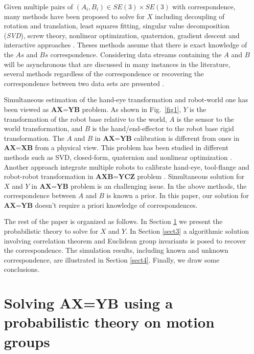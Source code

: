 \documentclass[conference,letterpaper]{IEEEtran}
\begin{document}
Given multiple pairs of $(A_{i},B_{i}) \in SE(3) \times SE(3)$ with correspondence, many methods have been proposed to solve for $X$ including decoupling of rotation and translation, least squares fitting, singular value decomposition (\emph{SVD}), screw theory, nonlinear
optimization, quaternion, gradient descent and interactive approaches \cite{Shiu1989,Tsai1989,Wang1992,Park1994,Horaud1995,Daniilidis1999,Fassi2005,Zhao2011,Ackerman2014a}. Theses methods assume that there is exact knowledge of the $As$ and $Bs$ correspondence. Considering data streams containing the $A$ and $B$ will be asynchronous that are discussed in many instances
in the literature, several methods regardless of the correspondence or recovering the correspondence between two data sets are presented \cite{Ackerman2013a,Ackerman2013,Ackerman2014}.

Simultaneous estimation of the hand-eye transformation and robot-world one
has been viewed as $\textbf{AX=YB}$ problem. As shown in Fig.~\ref{fig1}, $Y$ is the transformation of the robot base relative to the world, $A$ is the sensor to the world transformation, and $B$ is the hand/end-effector to the robot base rigid transformation. The $A$ and $B$ in $\textbf{AX=YB}$ calibration is different from ones in $\textbf{AX=XB}$ from a physical view. This problem has been studied in different methods such as SVD, closed-form, quaternion and nonlinear optimization \cite{Zhuang1994,dornaika1998simultaneous,Hirsh2001, ernst2012non,strobl2006optimal,Li2010,Shah2013,Heller2014}. Another approach integrate multiple robots to calibrate hand-eye, tool-flange and robot-robot transformation in $\textbf{AXB=YCZ}$ problem \cite{Wang2014}. Simultaneous solution for $X$ and $Y$ in $\textbf{AX=YB}$ problem is an challenging issue. In the above methods, the correspondence between $A$ and $B$ is known a prior. In this paper, our solution for $\textbf{AX=YB}$ doesn't require a priori knowledge of correspondences.

The rest of the paper is organized as follows. In Section
\ref{sect2} we present the probabilistic theory to solve for $X$ and $Y$. In Section \ref{sect3} a algorithmic solution involving correlation theorem and Euclidean group invariants is posed to recover the correspondence. The simulation results, including known  and unknown correspondence, are illustrated in Section \ref{sect4}. Finally, we draw some conclusions.

\section{Solving AX=YB using a probabilistic theory on motion groups}
\label{sect2}
\end{document}
